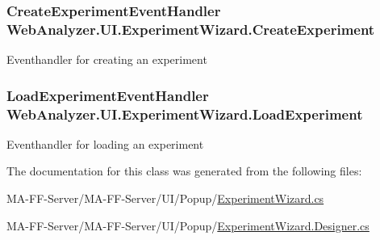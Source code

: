 \subsubsection[{Create\+Experiment}]{\setlength{\rightskip}{0pt plus 5cm}Create\+Experiment\+Event\+Handler Web\+Analyzer.\+U\+I.\+Experiment\+Wizard.\+Create\+Experiment}\label{class_web_analyzer_1_1_u_i_1_1_experiment_wizard_ac18185c9d12c074d2b82c2426e545461}


Eventhandler for creating an experiment 

\hypertarget{class_web_analyzer_1_1_u_i_1_1_experiment_wizard_ad469bc433ee12cf551309f1b2ab37e65}{}
\subsubsection[{Load\+Experiment}]{\setlength{\rightskip}{0pt plus 5cm}Load\+Experiment\+Event\+Handler Web\+Analyzer.\+U\+I.\+Experiment\+Wizard.\+Load\+Experiment}\label{class_web_analyzer_1_1_u_i_1_1_experiment_wizard_ad469bc433ee12cf551309f1b2ab37e65}


Eventhandler for loading an experiment 



The documentation for this class was generated from the following files\+:\begin{DoxyCompactItemize}
\item 
M\+A-\/\+F\+F-\/\+Server/\+M\+A-\/\+F\+F-\/\+Server/\+U\+I/\+Popup/\hyperlink{_experiment_wizard_8cs}{Experiment\+Wizard.\+cs}\item 
M\+A-\/\+F\+F-\/\+Server/\+M\+A-\/\+F\+F-\/\+Server/\+U\+I/\+Popup/\hyperlink{_experiment_wizard_8_designer_8cs}{Experiment\+Wizard.\+Designer.\+cs}\end{DoxyCompactItemize}
